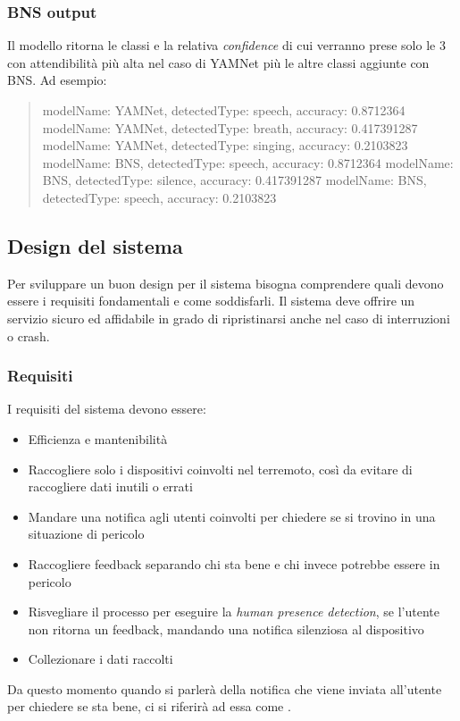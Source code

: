 \documentclass[main.tex]{subfiles}
\begin{document}
\subsubsection{BNS output}
Il modello ritorna le classi e la relativa \emph{confidence} di cui verranno prese solo le 3 con attendibilità più alta nel caso di YAMNet più le altre classi aggiunte con BNS. Ad esempio:
\begin{quote}

  {
    modelName: YAMNet,
    detectedType: speech,
    accuracy: 0.8712364
  } \newline
  {
    modelName: YAMNet,
    detectedType: breath,
    accuracy: 0.417391287
  }\newline
  {
    modelName: YAMNet,
    detectedType: singing,
    accuracy: 0.2103823
  }\newline
  {
    modelName: BNS,
    detectedType: speech,
    accuracy: 0.8712364
  }\newline
  {
    modelName: BNS,
    detectedType: silence,
    accuracy: 0.417391287
  }\newline
  {
    modelName: BNS,
    detectedType: speech,
    accuracy: 0.2103823
  }
\end{quote}
\subsection{Design del sistema}
Per sviluppare un buon design per il sistema bisogna comprendere quali devono essere i requisiti fondamentali e come soddisfarli. Il sistema deve offrire un servizio sicuro ed affidabile in grado di ripristinarsi anche nel caso di interruzioni o crash.

\subsubsection{Requisiti}
I requisiti del sistema devono essere:
\begin{itemize}
    \item Efficienza e mantenibilità 
    \item Raccogliere solo i dispositivi coinvolti nel terremoto, così da evitare di raccogliere dati inutili o errati
    \item Mandare una notifica agli utenti coinvolti per chiedere se si trovino in una situazione di pericolo
    \item Raccogliere feedback separando chi sta bene e chi invece potrebbe essere in pericolo
    \item Risvegliare il processo per eseguire la \emph{human presence detection}, se l'utente non ritorna un feedback, mandando una notifica silenziosa al dispositivo
    \item Collezionare i dati raccolti
\end{itemize}
Da questo momento quando si parlerà della notifica che viene inviata all'utente per chiedere se sta bene, ci si riferirà ad essa come .
\end{document}
